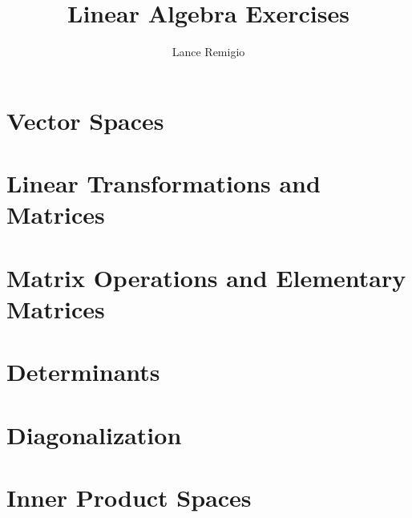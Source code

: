 \documentclass[11pt, a4paper]{book}
\title{Linear Algebra Exercises}
\author{Lance Remigio}
\begin{document}
\tableofcontents
\maketitle 

\chapter{Vector Spaces}











\chapter{Linear Transformations and Matrices}











\chapter{Matrix Operations and Elementary Matrices}



\chapter{Determinants}





\chapter{Diagonalization}





\chapter{Inner Product Spaces}




\end{document}
